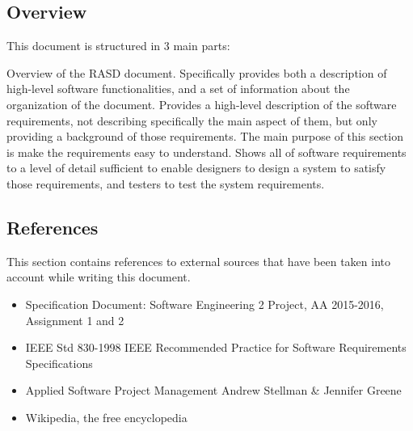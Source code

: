 \subsection{Overview}
This document is structured in 3 main parts:
\begin{itemize}
	 Overview of the RASD document. Specifically provides both a description of high-level software functionalities, and a set of information about the organization of the document.
	 Provides a high-level description of the software requirements, not describing specifically the main aspect of them, but only providing a background of those requirements. The main purpose of this section is make the requirements easy to understand.
	 Shows all of software requirements to a level of detail sufficient to enable designers to design a system to satisfy those requirements, and testers to test the system requirements.
\end{itemize}
\subsection{References}
This section contains references to external sources that have been taken into account while writing this document.
\begin{itemize}
	\item Specification Document: Software Engineering 2 Project, AA 2015-2016, Assignment 1 and 2
	\item IEEE Std 830-1998 IEEE Recommended Practice for Software Requirements Specifications
	\item Applied Software Project Management Andrew Stellman \& Jennifer Greene
	\item Wikipedia, the free encyclopedia
\end{itemize}